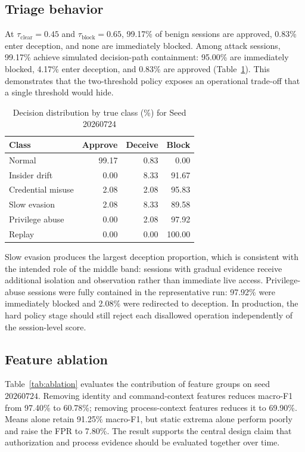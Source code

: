 \documentclass[journal]{IEEEtran}
\renewcommand{\arraystretch}{1.08}
\begin{document}
\subsection{Triage behavior}
At $\tau_{\mathrm{clear}} = 0.45$ and $\tau_{\mathrm{block}} = 0.65$, 99.17\% of benign sessions are approved, 0.83\% enter deception, and none are immediately blocked. Among attack sessions, 99.17\% achieve simulated decision-path containment: 95.00\% are immediately blocked, 4.17\% enter deception, and 0.83\% are approved (Table~\ref{tab:triageclass}). This demonstrates that the two-threshold policy exposes an operational trade-off that a single threshold would hide.

\begin{table}[t]
\centering
\caption{Decision distribution by true class (\%) for Seed 20260724}
\label{tab:triageclass}
\renewcommand{\arraystretch}{1.12}
\begin{tabular}{@{}lrrr@{}}
\toprule
\textbf{Class} & \textbf{Approve} & \textbf{Deceive} & \textbf{Block} \\
\midrule
Normal & 99.17 & 0.83 & 0.00 \\
Insider drift & 0.00 & 8.33 & 91.67 \\
Credential misuse & 2.08 & 2.08 & 95.83 \\
Slow evasion & 2.08 & 8.33 & 89.58 \\
Privilege abuse & 0.00 & 2.08 & 97.92 \\
Replay & 0.00 & 0.00 & 100.00 \\
\bottomrule
\end{tabular}
\end{table}


Slow evasion produces the largest deception proportion, which is consistent with the intended role of the middle band: sessions with gradual evidence receive additional isolation and observation rather than immediate live access. Privilege-abuse sessions were fully contained in the representative run: 97.92\% were immediately blocked and 2.08\% were redirected to deception. In production, the hard policy stage should still reject each disallowed operation independently of the session-level score.

\subsection{Feature ablation}
Table~\ref{tab:ablation} evaluates the contribution of feature groups on seed $20260724$. Removing identity and command-context features reduces macro-F1 from 97.40\% to 60.78\%; removing process-context features reduces it to 69.90\%. Means alone retain 91.25\% macro-F1, but static extrema alone perform poorly and raise the FPR to 7.80\%. The result supports the central design claim that authorization and process evidence should be evaluated together over time.
\end{document}
